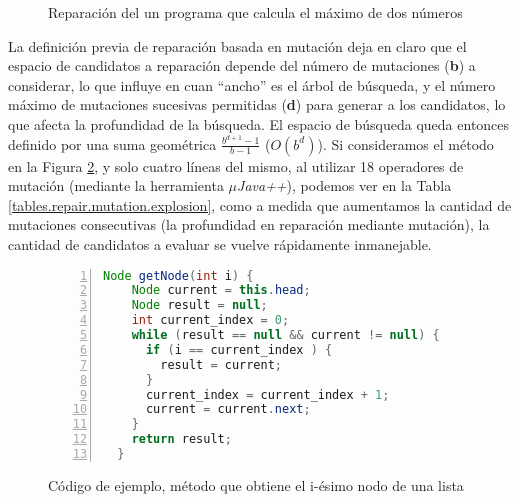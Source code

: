 \begin{figure}
	\caption{Reparaci\'on del un programa que calcula el m\'aximo de dos n\'umeros}
	\label{figures.examples.repairWithMutation}
\end{figure}

La definici\'on previa de reparaci\'on basada en mutaci\'on deja en claro que el espacio de candidatos a reparaci\'on depende del n\'umero de mutaciones (\textbf{b}) a considerar, lo que influye en cuan ``ancho'' es el \'arbol de b\'usqueda, y el n\'umero m\'aximo de mutaciones sucesivas permitidas (\textbf{d}) para generar a los candidatos, lo que afecta la profundidad de la b\'usqueda. El espacio de b\'usqueda queda entonces definido por una suma geom\'etrica $\frac{b^{d+1}-1}{b-1}$ ($O(b^d)$). Si consideramos el m\'etodo en la Figura \ref{figures.examples.repair.getNode}, y solo cuatro l\'ineas del mismo, al utilizar 18 operadores de mutaci\'on (mediante la herramienta \emph{$\mu$Java++}), podemos ver en la Tabla \ref{tables.repair.mutation.explosion}, como a medida que aumentamos la cantidad de mutaciones consecutivas (la profundidad en reparaci\'on mediante mutaci\'on), la cantidad de candidatos a evaluar se vuelve r\'apidamente inmanejable.

\begin{figure}
	\begin{lstlisting}[mathescape=true,language=Java,numbers=left,xleftmargin=20pt]
  Node getNode(int i) {
    Node current = this.head;
    Node result = null;
    int current_index = 0;
    while (result == null && current != null) {
      if (i == current_index ) {
        result = current;
      }
      current_index = current_index + 1;
      current = current.next;
    }
    return result;
  }
	\end{lstlisting}
	\caption{C\'odigo de ejemplo, m\'etodo que obtiene el i-\'esimo nodo de una lista}
	\label{figures.examples.repair.getNode}
\end{figure}

